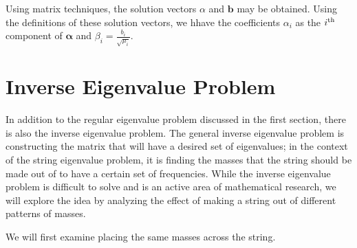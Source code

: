 \documentclass[10pt,a4paper]{article}
\renewcommand{\vec}[1]{\boldsymbol{#1}}
\begin{document}
\begin{multicols*}{2}
Using matrix techniques, the solution vectors $\alpha$ and $\vec{b}$ may be obtained. Using the definitions of these solution vectors, we hhave the coefficients $\alpha_i$ as the $i^{\rm{th}}$ component of $\vec{\alpha}$ and $\beta_i = \frac{b_i}{\sqrt{\mu_i}}$.


\section*{Inverse Eigenvalue Problem}
In addition to the regular eigenvalue problem discussed in the first section, there is also the inverse eigenvalue problem. The general inverse eigenvalue problem is constructing the matrix that will have a desired set of eigenvalues; in the context of the string eigenvalue problem, it is finding the masses that the string should be made out of to have a certain set of frequencies. While the inverse eigenvalue problem is difficult to solve and is an active area of mathematical research, we will explore the idea by analyzing the effect of making a string out of different patterns of masses.

We will first examine placing the same masses across the string.


\end{multicols*}
\end{document}
